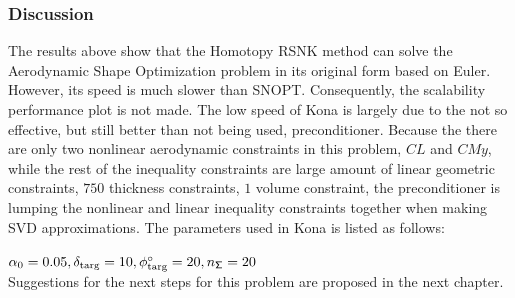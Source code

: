\subsubsection{Discussion}
The results above show that the Homotopy RSNK method can solve the Aerodynamic Shape Optimization 
problem in its original form based on Euler. However, its speed is much slower than SNOPT. Consequently, 
the scalability performance plot is not made. The low speed of Kona is largely due to the not so effective, but still 
better than not being used, preconditioner. Because the there are only two nonlinear aerodynamic constraints in this problem, $CL$ and $CMy$, while the rest of the inequality constraints are large amount of linear geometric constraints, $750$ thickness constraints, $1$ volume constraint, the preconditioner is lumping the nonlinear and linear inequality constraints together when making SVD approximations.  The parameters used in Kona is listed as follows: 

$\alpha_0=0.05,  \delta_{\text{targ}}=10, \phi^{\circ}_{\text{targ}}=20, n_{\mathsf{\Sigma}}=20 $ \\

Suggestions for the next steps for this problem are proposed in the next chapter. 






